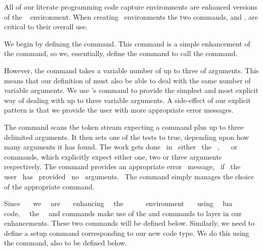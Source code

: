 
\startchapter[title=The capture and manipulation of code]

All of our literate programming code capture environments are enhanced 
versions of the \ConTeXt\  environment. When creating 
 \ConTeXt\ environments the two commands, 
 and \type{\setupXXX}, are critical to their overall use. 

We begin by defining the  command. This command is a 
simple enhancement of the  command, so we, 
essentially, define the  command to call the 
 command.

However, the  command takes a variable number of up to 
three of arguments. This means that our definition of 
 must also be able to deal with the same number of 
variable arguments. We use \ConTeXt's \type{\dotripleempty} command to 
provide the simplest and most explicit way of dealing with up to three 
variable arguments. A side-effect of our explicit pattern is that we 
provide the user with more appropriate error messages. 

The \type{\dotripleempty} command scans the token stream expecting a 
command plus up to three \quote{[} \quote{]} delimited arguments. It then 
sets one of the \type{\ifXXXargument} tests to true, depending upon how 
many arguments it has found. The  work gets done~ in~ either~ 
the~ ,~ ~ or 
 commands, which explicitly expect either one, 
two or three arguments respectively. The  
command provides an appropriate error~ message,~ if~ the~ user~ has~ 
provided~ no~ arguments.~ The  command simply 
manages the choice of the appropriate  command. 

Since~~~ we~~ are~~~ enhancing~~ the~~~ ~~ environment~~~ using~~ lua~~~ 
code,~~ the~~  and  
commands make use of the \type{\fixStartLitProgs} and 
\type{\fixStopLitProgs} commands to layer in our enhancements. These two 
commands will be defined below. Similarly, we need to define a setup 
command corresponding to our new code type. We do this using the 
 command, also to be defined below. 

